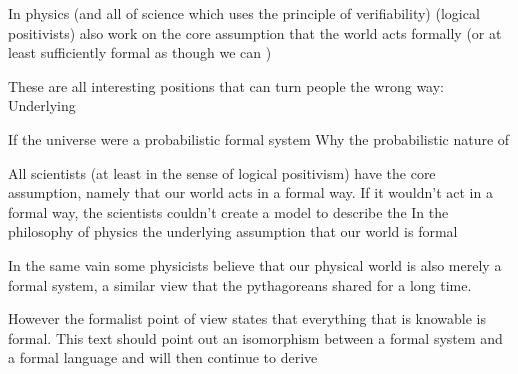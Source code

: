 In physics (and all of science which uses the principle of verifiability)  (logical positivists) also work on the core assumption that the world acts formally (or at least sufficiently formal as though we can )


These are all interesting positions that can turn people the wrong way: Underlying 

If the universe were a probabilistic formal system
Why the probabilistic nature of 


All scientists (at least in the sense of logical positivism) have the core assumption, namely that our world acts in a formal way. If it wouldn't act in a formal way, the scientists couldn't create a model to describe the 
In the philosophy of physics the underlying assumption that our world is formal 



In the same vain some physicists believe that our physical world is also merely a formal system, a similar view that the pythagoreans shared for a long time.

However the formalist point of view states that everything that is knowable is formal. This text should point out an isomorphism between a formal system and a formal language and will then continue to derive

\fi